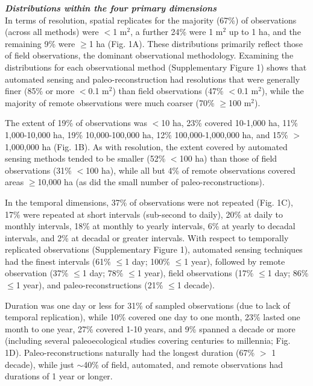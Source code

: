 \documentclass[12pt]{article}
\begin{document}
\vspace{5pt}
\noindent \textbf{\emph{Distributions within the four primary dimensions}}\\
In terms of resolution, spatial replicates for the majority (67\%) of observations (across all methods) were $<$1 m$^2$, a further 24\% were 1 m$^2$ up to 1 ha, and the remaining 9\% were $\geq$1 ha (Fig. 1A). These distributions primarily reflect those of field observations, the dominant observational methodology. Examining the distributions for each observational method (Supplementary Figure 1) shows that automated sensing and paleo-reconstruction had resolutions that were generally finer (85\% or more $<$0.1 m$^2$) than field observations (47\% $<$0.1 m$^2$), while the majority of remote observations were much coarser (70\% $\geq$100 m$^2$).   

The extent of 19\% of observations was $<$10 ha, 23\% covered 10-1,000 ha, 11\% 1,000-10,000 ha, 19\% 10,000-100,000 ha, 12\% 100,000-1,000,000 ha, and 15\% $>$1,000,000 ha (Fig. 1B).  As with resolution, the extent covered by automated sensing methods tended to be smaller (52\% $<$100 ha) than those of field observations (31\% $<$100 ha), while all but 4\% of remote observations covered areas $\geq$10,000 ha (as did the small number of paleo-reconstructions).  


In the temporal dimensions, 37\% of observations were not repeated (Fig. 1C), 17\% were repeated at short intervals (sub-second to daily), 20\% at daily to monthly intervals, 18\% at monthly to yearly intervals, 6\% at yearly to decadal intervals, and 2\% at decadal or greater intervals. With respect to temporally replicated observations (Supplementary Figure 1), automated sensing techniques had the finest intervals (61\% $\leq$1 day; 100\% $\leq$1 year), followed by remote observation (37\% $\leq$1 day; 78\% $\leq$1 year), field observations (17\% $\leq$1 day; 86\% $\leq$1 year), and paleo-reconstructions (21\% $\leq$1 decade).   

Duration was one day or less for 31\% of sampled observations (due to lack of temporal replication), while 10\% covered one day to one month, 23\% lasted one month to one year, 27\% covered 1-10 years, and 9\% spanned a decade or more (including several paleoecological studies covering centuries to millennia; Fig. 1D). Paleo-reconstructions naturally had the longest duration (67\% $>$ 1 decade), while just $\sim$40\% of field, automated, and remote observations had durations of 1 year or longer.
\end{document}
